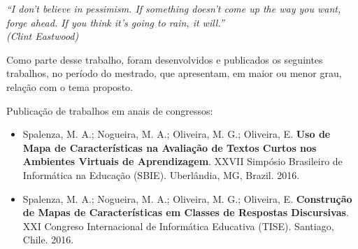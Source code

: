 \newpage
\begin{flushright}
\vspace{17cm}
\vspace*{0.75\textheight}
\textit{``I don't believe in pessimism. If something doesn't come up the way you want, forge ahead. If you think it's going to rain, it will.''\\
(Clint Eastwood)}
\end{flushright}
















\newpage
\doublespacing


\par Como parte desse trabalho, foram desenvolvidos e publicados os seguintes trabalhos, no período do mestrado, que apresentam, em maior ou menor grau, relação com o tema proposto.


\par Publicação de trabalhos em anais de congressos:
\begin{itemize}
\itemsep=-.3mm

\item Spalenza, M. A.; Nogueira, M. A.; Oliveira, M. G.; Oliveira, E. \textbf{Uso de Mapa de Características na Avaliação de Textos Curtos nos Ambientes Virtuais de Aprendizagem}. XXVII Simpósio Brasileiro de Informática na Educação (SBIE). Uberlândia, MG, Brazil. 2016.

\item Spalenza, M. A.; Nogueira, M. A.; Oliveira, M. G.; Oliveira, E. \textbf{Construção de Mapas de Características em Classes de Respostas Discursivas}.  XXI Congreso Internacional de Informática Educativa (TISE). Santiago, Chile. 2016.

\end{itemize}








